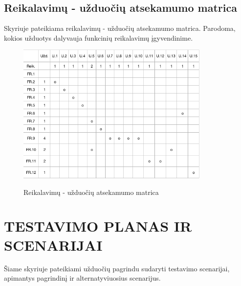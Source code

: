\documentclass{VUMIFPSkursinis}
\begin{document}
	\subsection{Reikalavimų - užduočių atsekamumo matrica}
	Skyriuje pateikiama reikalavimų - užduočių atsekamumo matrica. Parodoma, kokios užduotys dalyvauja funkcinių reikalavimų įgyvendinime.\\
	\begin{figure}[H]
		\centering
		\includegraphics[width=0.85\textwidth]{img/matrix.png}
		\label{fig:matrix}
		\caption{Reikalavimų - užduočių atsekamumo matrica}
	\end{figure}

	\newpage

	\section{TESTAVIMO PLANAS IR SCENARIJAI}
	Šiame skyriuje pateikiami užduočių pagrindu sudaryti testavimo scenarijai, apimantys pagrindinį ir alternatyviuosius scenarijus.
\end{document}
